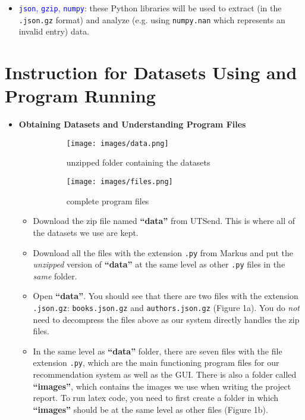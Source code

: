 \documentclass[fontsize=11pt]{article}
\begin{document}
\begin{itemize}
\begin{itemize}
    \item \textcolor{blue}{\texttt{json}, \texttt{gzip}, \texttt{numpy}}: these Python libraries will be used to extract (in the \texttt{.json.gz} format) and analyze (e.g. using \texttt{numpy.nan} which represents an invalid entry) data.
\end{itemize}
\end{itemize}

\section*{Instruction for Datasets Using and Program Running}
\begin{itemize}
    \item \textbf{Obtaining Datasets and Understanding Program Files}
    \begin{figure}[h!]
	\centering
        \begin{subfigure}[b]{0.3\textwidth}
    	\texttt{[image: images/data.png]}
            \caption{unzipped folder containing the datasets}
        \end{subfigure}
        \begin{subfigure}[b]{0.3\textwidth}
            \texttt{[image: images/files.png]}
            \caption{complete program files}
        \end{subfigure}
        \caption{}
        \label{fig:folder}
    \end{figure}
    \begin{itemize}
        \item Download the zip file named \textbf{``data''} from UTSend. This is where all of the datasets we use are kept.
        \item Download all the files with the extension \texttt{.py} from Markus and put the \textit{unzipped} version of \textbf{``data''} at the same level as other \texttt{.py} files in the \textit{same} folder.
        \item Open \textbf{``data''}. You should see that there are two files with the extension \texttt{.json.gz}: \texttt{books.json.gz} and \texttt{authors.json.gz} (Figure 1a). You do \textit{not} need to decompress the files above as our system directly handles the zip files.
        \item In the same level as \textbf{``data''} folder, there are seven files with the file extension \texttt{.py}, which are the main functioning program files for our recommendation system as well as the GUI. There is also a folder called \textbf{``images''}, which contains the images we use when writing the project report. To run latex code, you need to first create a folder in which \textbf{``images''} should be at the same level as other files (Figure 1b).
    \end{itemize}


\end{itemize}
\end{document}

